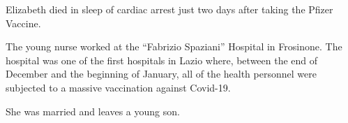 Elizabeth died in sleep of cardiac arrest just two days after taking the Pfizer
Vaccine.

The young nurse worked at the “Fabrizio Spaziani” Hospital in Frosinone. The
hospital was one of the first hospitals in Lazio where, between the end of
December and the beginning of January, all of the health personnel were
subjected to a massive vaccination against Covid-19.

She was married and leaves a young son.


